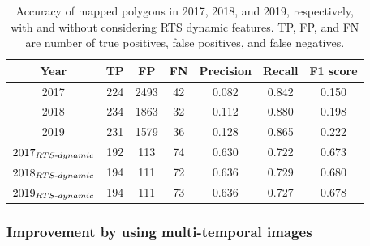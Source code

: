 \documentclass[authoryear,preprint,review,12pt]{elsarticle}
\begin{document}
\begin{table}[ht]
\footnotesize
  \centering
  \caption{Accuracy of mapped polygons in 2017, 2018, and 2019, respectively, with and without considering RTS dynamic features. TP, FP, and FN are number of true positives, false positives, and false negatives.}
    \begin{tabular}{c c c c c c c}
\toprule
    \textbf{Year} & \textbf{TP} & \textbf{FP} & \textbf{FN} & \textbf{Precision} & \textbf{Recall} & \textbf{F1 score} \\
\midrule
   2017 & 224   & 2493  & 42    & 0.082 & 0.842 & 0.150 \\
   2018 & 234   & 1863  & 32    & 0.112 & 0.880 & 0.198 \\
   2019 & 231   & 1579  & 36    & 0.128 & 0.865 & 0.222 \\
   $2017_{RTS{\text -}dynamic}$ & 192   & 113   & 74    & 0.630 & 0.722 & 0.673 \\
   $2018_{RTS{\text -}dynamic}$ & 194   & 111   & 72    & 0.636 & 0.729 & 0.680 \\
   $2019_{RTS{\text -}dynamic}$ & 194   & 111   & 73    & 0.636 & 0.727 & 0.678 \\

\bottomrule
    \end{tabular}
  \label{table_accuracy_f1}
\end{table}


\subsubsection{Improvement by using multi-temporal images}
\label{sec_improve_using_multi_images}
\end{document}
